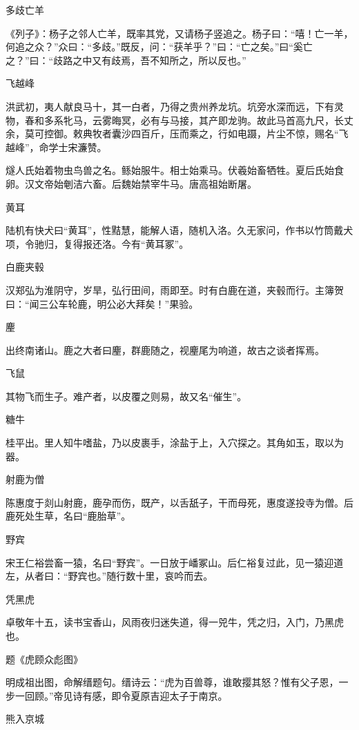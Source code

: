 \documentclass[a4paper,12pt,UTF8,twoside]{ctexbook}
\begin{document}
    多歧亡羊
    
    《列子》：杨子之邻人亡羊，既率其党，又请杨子竖追之。杨子曰：“嘻！亡一羊，何追之众？”众曰：“多歧。”既反，问：“获羊乎？”曰：“亡之矣。”曰“奚亡之？”曰：“歧路之中又有歧焉，吾不知所之，所以反也。”
    
    飞越峰
    
    洪武初，夷人献良马十，其一白者，乃得之贵州养龙坑。坑旁水深而远，下有灵物，春和多系牝马，云雾晦冥，必有与马接，其产即龙驹。故此马首高九尺，长丈余，莫可控御。敕典牧者囊沙四百斤，压而乘之，行如电蹑，片尘不惊，赐名“飞越峰”，命学士宋濂赞。
    
    燧人氏始着物虫鸟兽之名。鲧始服牛。相士始乘马。伏羲始畜牺牲。夏后氏始食卵。汉文帝始剦洁六畜。后魏始禁宰牛马。唐高祖始断屠。
    
    黄耳
    
    陆机有快犬曰“黄耳”，性黠慧，能解人语，随机入洛。久无家问，作书以竹筒戴犬项，令驰归，复得报还洛。今有“黄耳冢”。
    
    白鹿夹毂
    
    汉郑弘为淮阴守，岁旱，弘行田间，雨即至。时有白鹿在道，夹毂而行。主簿贺曰：“闻三公车轮鹿，明公必大拜矣！”果验。
    
    麈
    
    出终南诸山。鹿之大者曰麈，群鹿随之，视麈尾为响道，故古之谈者挥焉。
    
    飞鼠
    
    其物飞而生子。难产者，以皮覆之则易，故又名“催生”。
    
    糖牛
    
    桂平出。里人知牛嗜盐，乃以皮裹手，涂盐于上，入穴探之。其角如玉，取以为器。
    
    射鹿为僧
    
    陈惠度于剡山射鹿，鹿孕而伤，既产，以舌舐子，干而母死，惠度遂投寺为僧。后鹿死处生草，名曰“鹿胎草”。
    
    野宾
    
    宋王仁裕尝畜一猿，名曰“野宾”。一日放于嶓冢山。后仁裕复过此，见一猿迎道左，从者曰：“野宾也。”随行数十里，哀吟而去。
    
    凭黑虎
    
    卓敬年十五，读书宝香山，风雨夜归迷失道，得一兕牛，凭之归，入门，乃黑虎也。
    
    题《虎顾众彪图》
    
    明成祖出图，命解缙题句。缙诗云：“虎为百兽尊，谁敢撄其怒？惟有父子恩，一步一回顾。”帝见诗有感，即令夏原吉迎太子于南京。
    
    熊入京城
    
\end{document}
